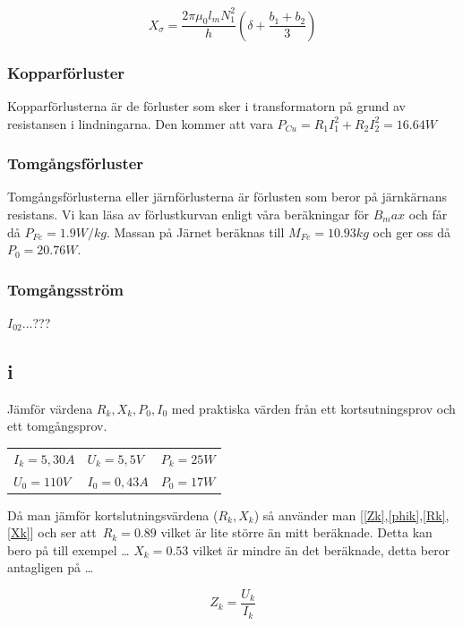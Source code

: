 \documentclass{article}
\begin{document}
\begin{equation}
  X_\sigma = \frac{2 \pi \mu_0 l_m N_1^2}{h} (\delta + \frac{b_1 + b_2}{3})
  \label{Xd}
\end{equation}

\subsubsection{Kopparförluster}
Kopparförlusterna är de förluster som sker i transformatorn på grund av resistansen i lindningarna.
Den kommer att vara $P_{Cu}=R_1 I_1^2 +R_2I_2^2=16.64 W$

\subsubsection{Tomgångsförluster}
Tomgångsförlusterna eller järnförlusterna är förlusten som beror på järnkärnans resistans.
Vi kan läsa av förlustkurvan enligt våra beräkningar för $B_max$ och får då $P_{Fe}=1.9 W/kg$.
Massan på Järnet beräknas till $M_{Fe}= 10.93 kg$ och ger oss då $P_0=20.76 W$.


\subsubsection{Tomgångsström}
$I_{02}$...???

\subsection{i}
Jämför värdena $R_k,X_k,P_0,I_0$ med praktiska värden från ett kortsutningsprov och ett tomgångsprov.

\begin{tabular}{l l l}
  $I_k = 5,30 A$ & $U_k = 5,5 V $&$ P_k = 25 W$\\
  $U_0 = 110 V $&$ I_0 = 0,43 A $&$ P_0 = 17 W$\\
\end{tabular}

Då man jämför kortslutningsvärdena ($R_k,X_k$) så använder man [\ref{Zk},\ref{phik},\ref{Rk},\ref{Xk}] och ser att\
$R_k= 0.89$ vilket är lite större än mitt beräknade.
Detta kan bero på till exempel \ldots
$X_k= 0.53$ vilket är mindre än det beräknade, detta beror antagligen på \ldots

\begin{equation}
  Z_k=\frac{U_k}{I_k}
  \label{Zk}
\end{equation}
\end{document}
